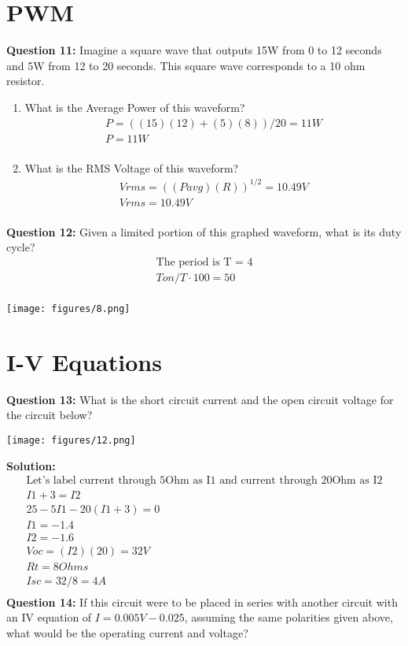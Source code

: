 \documentclass{article}
\begin{document}
\section*{PWM}
\textbf{Question 11:} Imagine a square wave that outputs 15W from 0 to 12 seconds and 5W from 12 to 20 seconds. This square wave corresponds to a 10 ohm resistor.
\begin{enumerate}
    \item What is the Average Power of this waveform?
\begin{align*}
   P = ((15)(12) + (5)(8))/20 = 11 W\\
   \boxed{P = 11 W}\\
\end{align*}
    \item What is the RMS Voltage of this waveform?
\begin{align*}
   Vrms  = ((Pavg)(R))^{1/2}= 10.49 V\\
   \boxed{Vrms = 10.49 V}\\
\end{align*}
\end{enumerate}
\textbf{Question 12:} Given a limited portion of this graphed waveform, what is its duty cycle?
\begin{align*}
   \text{The period is T = 4}\\
   Ton/T \cdot 100 = \boxed{50}\\
\end{align*}

\begin{center}

        \texttt{[image: figures/8.png]}
\end{center}

\pagebreak

\section*{I-V Equations}
\textbf{Question 13:} What is the short circuit current and the open circuit voltage for the circuit below?
\begin{center}

        \texttt{[image: figures/12.png]}

\end{center}

\textbf{Solution:}
\begin{align*}
    \text{Let's label current through 5Ohm as I1 and current through 20Ohm as I2}\\
    I1 + 3 = I2 \\
    25 - 5I1 - 20(I1 + 3) = 0\\
    I1 = -1.4\\
    I2 = -1.6\\
    Voc = (I2)(20) = \boxed{32V}\\
    Rt = 8 Ohms\\
    Isc = 32/8 = \boxed{4A}\\
\end{align*}
\textbf{Question 14:} If this circuit were to be placed in series with another circuit with an IV equation of \(I = 0.005V - 0.025\), assuming the same polarities given above, what would be the operating current and voltage?
\end{document}
